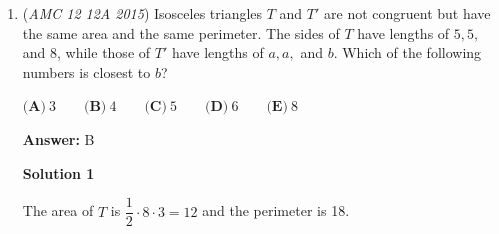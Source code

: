 \begin{enumerate}
\textbf{Solution 3 (Less Counting)}

Let $BC = n$ and $CD = AD = m$ be positive integers. Drop a perpendicular from $A$ to $CD$. Denote the intersection point of the perpendicular and $CD$ as $E$.

 $AE$'s length is $n$, and $ED = m-2$By the Pythagorean Theorem,  $m^2 = (m-2)^2 + n^2$, therefore $n^2 = 4(m-1)$

 Notice that 4 is already a perfect square and $n$ is an integer, meaning $m-1$ also has to be a perfect square. We can denote $m-1$ as $x^2$, therefore we have $m = x^2 + 1$, $n = 2x$, and each $x$ will correspond to a pair of $(n, m)$. 

 Since $p<2015$, $2 + n + m + m<2015$ which gives us $n+2m<2013$. Substituting $x$ will give us $2x+2(x^2 + 1) < 2013$, simplify this will again give us $x^2 + x + 1 < 1006.5$Try $x = 32$, $x^2 + x + 1 = 1057 > 1006.5$, exceededso $x$ must be less than $32$

 When $x=31$, $x^2 + x + 1 = 993 < 1006.5$, $x=31$ works for us.

 For $x$ in $(0, \infty)$, $f(x) = x^2 + x + 1$ increases, therefore for any $x<31$, $f(x) < f(31) < 1006.5$

 Thus, any $x$ in $[1, 31]$ satisfy the condition that $x^2 + x + 1 < 1006.5$. $x$ needs to be integer, and there are $31$ integers in the interval $[1, 31]$. 

 Each $x$ corresponds to a $(n, m)$, meaning there are $31$ possible value for different pairs of $(n, m)$ and lead to $\boxed{\textbf{(B) } 31}$ possible values for the perimeter $p$. 

 \href{https://artofproblemsolving.com/videos/amc/2015amc10a/398}{https://artofproblemsolving.com/videos/amc/2015amc10a/398}

 


	\item (\textit{AMC 12 12A 2015}) Isosceles triangles $T$ and $T'$ are not congruent but have the same area and the same perimeter. The sides of $T$ have lengths of $5,5,$ and $8$, while those of $T'$ have lengths of $a,a,$ and $b$. Which of the following numbers is closest to $b$?


 $\textbf{(A)}\ 3 \qquad\textbf{(B)}\ 4 \qquad\textbf{(C)}\ 5 \qquad\textbf{(D)}\ 6 \qquad\textbf{(E)}\ 8$

 \textbf{Answer: }B



\textbf{Solution 1}

The area of $T$ is $\dfrac{1}{2} \cdot 8 \cdot 3 = 12$ and the perimeter is 18.


\end{enumerate}
